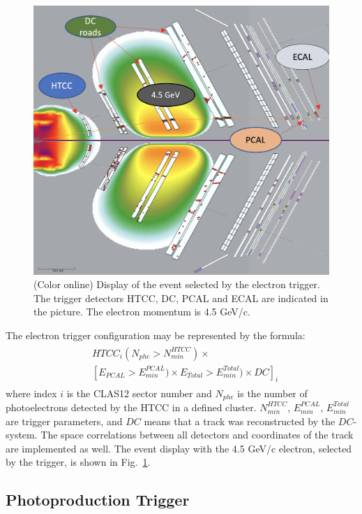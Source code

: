 \begin{figure}[!htb]
 	\centering
  	\includegraphics[width=0.95\columnwidth,keepaspectratio]{img/Electron_trigger.png}
 	\caption{(Color online) Display of the event selected by the electron trigger. The trigger detectors HTCC, DC, PCAL and ECAL are indicated in the picture. The electron momentum is 4.5 GeV/c.}
	\label{fig:electron}
\end{figure}

The electron trigger configuration may be represented by the formula:
\begin{align} 
\label{eq:em_trg_formula}
\begin{split}
 & HTCC_i(N_{phe}{>}N^{HTCC}_{min})\times\\
 & [E_{PCAL}{>}E^{PCAL}_{min}) \times E_{Total}{>}E^{Total}_{min})\times  DC]_i
 \end{split}
\end{align}
\noindent
where index $i$ is the CLAS12 sector number and $N_{phe}$ is the number of photoelectrons detected by the HTCC in a defined cluster. $N^{HTCC}_{min}$,  $E^{PCAL}_{min}$, $ E^{Total}_{min}$ are trigger parameters, and $DC$ means that  a track was reconstructed by the $DC$-system. The space correlations between all detectors and coordinates of the track are implemented as well. The event display with the 4.5 GeV/c electron, selected by the trigger, is shown in Fig.~\ref{fig:electron}.


\subsection{Photoproduction Trigger}
\label{sec:photoproduction_trigger}

